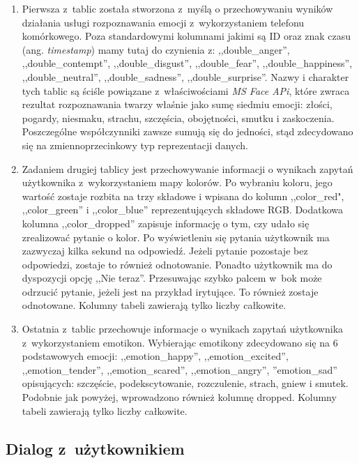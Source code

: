 \begin{enumerate}
	\item Pierwsza z~tablic została stworzona z~myślą o przechowywaniu wyników działania usługi rozpoznawania emocji z~wykorzystaniem telefonu komórkowego. Poza standardowymi kolumnami jakimi są ID oraz znak czasu (ang. \textit{timestamp}) mamy tutaj do czynienia z: ,,double\_anger'', ,,double\_contempt'', ,,double\_disgust'', ,,double\_fear'', ,,double\_happiness'', ,,double\_neutral'', ,,double\_sadness'', ,,double\_surprise''. Nazwy i charakter tych tablic są ściśle powiązane z~właściwościami \textit{MS Face APi}, które zwraca rezultat rozpoznawania twarzy właśnie jako sumę siedmiu emocji: złości, pogardy, niesmaku, strachu, szczęścia, obojętności, smutku i zaskoczenia. Poszczególne współczynniki zawsze sumują się do jedności, stąd zdecydowano się na zmiennoprzecinkowy typ reprezentacji danych.
	
	\item Zadaniem drugiej tablicy jest przechowywanie informacji o wynikach zapytań użytkownika z~wykorzystaniem mapy kolorów. Po wybraniu koloru, jego wartość zostaje rozbita na trzy składowe i wpisana do kolumn ,,color\_red", ,,color\_green'' i ,,color\_blue'' reprezentujących składowe RGB. Dodatkowa kolumna ,,color\_dropped'' zapisuje informację o tym, czy udało się zrealizować pytanie o kolor. Po wyświetleniu się pytania użytkownik ma zazwyczaj kilka sekund na odpowiedź. Jeżeli pytanie pozostaje bez odpowiedzi, zostaje to również odnotowanie. Ponadto użytkownik ma do dyspozycji opcję ,,Nie teraz''. Przesuwając szybko palcem w~bok może odrzucić pytanie, jeżeli jest na przykład irytujące. To również zostaje odnotowane. Kolumny tabeli zawierają tylko liczby całkowite.
	
	\item Ostatnia z~tablic przechowuje informacje o wynikach zapytań użytkownika z~wykorzystaniem emotikon. Wybierając emotikony zdecydowano się na 6 podstawowych emocji: ,,emotion\_happy'', ,,emotion\_excited'', ,,emotion\_tender'', ,,emotion\_scared'', ,,emotion\_angry'', ''emotion\_sad'' opisujących: szczęście, podekscytowanie, rozczulenie, strach, gniew i smutek. Podobnie jak powyżej, wprowadzono również kolumnę dropped. Kolumny tabeli zawierają tylko liczby całkowite.
\end{enumerate}


\subsection{Dialog z~użytkownikiem}

